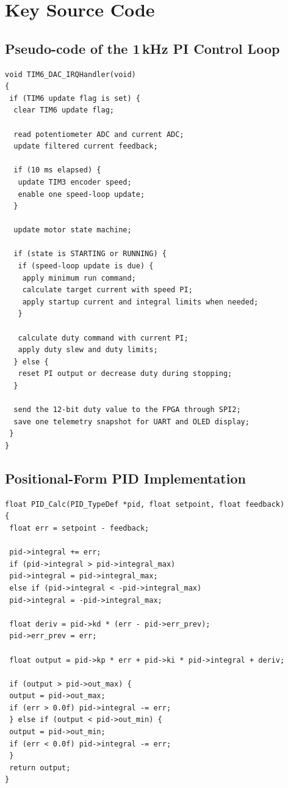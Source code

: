 \documentclass[12pt, a4paper]{report}
\begin{document}
\appendix

\chapter{Key Source Code}


\section{Pseudo-code of the 1\,kHz PI Control Loop}


\begin{lstlisting}[style=cstyle,caption={Pseudo-code of the 1 kHz control loop}]
void TIM6_DAC_IRQHandler(void)
{
 if (TIM6 update flag is set) {
  clear TIM6 update flag;

  read potentiometer ADC and current ADC;
  update filtered current feedback;

  if (10 ms elapsed) {
   update TIM3 encoder speed;
   enable one speed-loop update;
  }

  update motor state machine;

  if (state is STARTING or RUNNING) {
   if (speed-loop update is due) {
    apply minimum run command;
    calculate target current with speed PI;
    apply startup current and integral limits when needed;
   }

   calculate duty command with current PI;
   apply duty slew and duty limits;
  } else {
   reset PI output or decrease duty during stopping;
  }

  send the 12-bit duty value to the FPGA through SPI2;
  save one telemetry snapshot for UART and OLED display;
 }
}
\end{lstlisting}

\section{Positional-Form PID Implementation}


\begin{lstlisting}[style=cstyle,caption={PID calculation function, with kd set to zero for PI control}]
float PID_Calc(PID_TypeDef *pid, float setpoint, float feedback)
{
 float err = setpoint - feedback;

 pid->integral += err;
 if (pid->integral > pid->integral_max)
 pid->integral = pid->integral_max;
 else if (pid->integral < -pid->integral_max)
 pid->integral = -pid->integral_max;

 float deriv = pid->kd * (err - pid->err_prev);
 pid->err_prev = err;

 float output = pid->kp * err + pid->ki * pid->integral + deriv;

 if (output > pid->out_max) {
 output = pid->out_max;
 if (err > 0.0f) pid->integral -= err;
 } else if (output < pid->out_min) {
 output = pid->out_min;
 if (err < 0.0f) pid->integral -= err;
 }
 return output;
}
\end{lstlisting}
\end{document}
